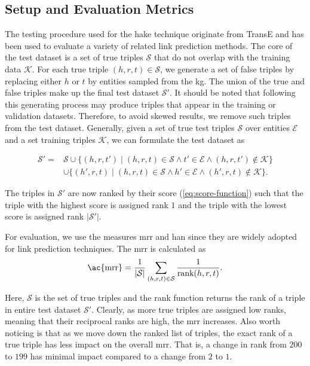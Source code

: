 \subsection{Setup and Evaluation Metrics}\label{sec:setup}

The testing procedure used for the \ac{hake} technique originate from TransE\cite{Bordes2013} and has been used to evaluate a variety of related link prediction methods.
The core of the test dataset is a set of true triples $\mathcal{S}$ that do not overlap with the training data $\mathcal{K}$.
For each true triple $(h, r, t) \in \mathcal{S}$, we generate a set of false triples by replacing either $h$ or $t$ by entities sampled from the \ac{kg}.
The union of the true and false triples make up the final test dataset $\mathcal{S'}$.
It should be noted that following this generating process may produce triples that appear in the training or validation datasets.
Therefore, to avoid skewed results, we remove such triples from the test dataset.
Generally, given a set of true test triples $\mathcal{S}$ over entities $\mathcal{E}$ and a set training triples $\mathcal{K}$, we can formulate the test dataset as

\begin{equation*}
  \begin{split}
    \mathcal{S'} = {} & \mathcal{S} \cup \{(h, r, t') \mid (h, r, t) \in \mathcal{S} \wedge t' \in \mathcal{E} \wedge (h, r, t') \not\in \mathcal{K}\} \\
    & \cup \{(h', r, t) \mid (h, r, t) \in \mathcal{S} \wedge h' \in \mathcal{E} \wedge (h', r, t) \not\in \mathcal{K}\}.
  \end{split}
\end{equation*}

The triples in $\mathcal{S'}$ are now ranked by their score (\ref{eq:score-function}) such that the triple with the highest score is assigned rank $1$ and the triple with the lowest score is assigned rank $|\mathcal{S'}|$.

For evaluation, we use the measures \ac{mrr} and \ac{han} since they are widely adopted for link prediction techniques.
The \ac{mrr} is calculated as
\begin{equation}\label{eq:mrr}
  \text{\ac{mrr}} = \frac{1}{|\mathcal{S}|} \sum_{(h, r, t) \in \mathcal{S}} \frac{1}{\text{rank}(h, r, t)}.
\end{equation}

Here, $\mathcal{S}$ is the set of true triples and the rank function returns the rank of a triple in entire test dataset $\mathcal{S'}$.
Clearly, as more true triples are assigned low ranks, meaning that their reciprocal ranks are high, the \ac{mrr} increases.
Also worth noticing is that as we move down the ranked list of triples, the exact rank of a true triple has less impact on the overall \ac{mrr}.
That is, a change in rank from $200$ to $199$ has minimal impact compared to a change from $2$ to $1$.

